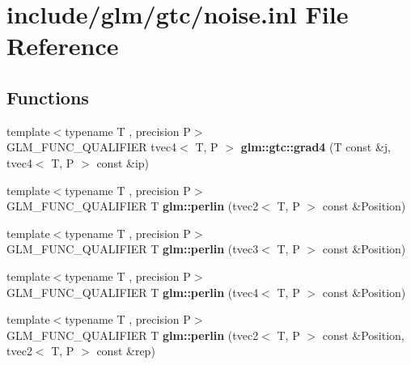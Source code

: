 \hypertarget{noise_8inl}{}\section{include/glm/gtc/noise.inl File Reference}
\label{noise_8inl}
\subsection*{Functions}
\begin{DoxyCompactItemize}
\item 
\mbox{\label{noise_8inl_a5c4a3d973c67fd78ab6bc8f993d172ac}} 
{\footnotesize template$<$typename T , precision P$>$ }\\G\+L\+M\+\_\+\+F\+U\+N\+C\+\_\+\+Q\+U\+A\+L\+I\+F\+I\+ER tvec4$<$ T, P $>$ {\bfseries glm\+::gtc\+::grad4} (T const \&j, tvec4$<$ T, P $>$ const \&ip)
\item 
\mbox{\label{noise_8inl_a911cdd6eb03df468ebd2b6f17ea43a3f}} 
{\footnotesize template$<$typename T , precision P$>$ }\\G\+L\+M\+\_\+\+F\+U\+N\+C\+\_\+\+Q\+U\+A\+L\+I\+F\+I\+ER T {\bfseries glm\+::perlin} (tvec2$<$ T, P $>$ const \&Position)
\item 
\mbox{\label{noise_8inl_a86c5aa2c23b2d0f62d3399ac024bc089}} 
{\footnotesize template$<$typename T , precision P$>$ }\\G\+L\+M\+\_\+\+F\+U\+N\+C\+\_\+\+Q\+U\+A\+L\+I\+F\+I\+ER T {\bfseries glm\+::perlin} (tvec3$<$ T, P $>$ const \&Position)
\item 
\mbox{\label{noise_8inl_accc072c37eff6ab426b7138d0bd1765f}} 
{\footnotesize template$<$typename T , precision P$>$ }\\G\+L\+M\+\_\+\+F\+U\+N\+C\+\_\+\+Q\+U\+A\+L\+I\+F\+I\+ER T {\bfseries glm\+::perlin} (tvec4$<$ T, P $>$ const \&Position)
\item 
\mbox{\label{noise_8inl_aa51d7040ecd2773574a520a4bd41f680}} 
{\footnotesize template$<$typename T , precision P$>$ }\\G\+L\+M\+\_\+\+F\+U\+N\+C\+\_\+\+Q\+U\+A\+L\+I\+F\+I\+ER T {\bfseries glm\+::perlin} (tvec2$<$ T, P $>$ const \&Position, tvec2$<$ T, P $>$ const \&rep)
\item 

\end{DoxyCompactItemize}
